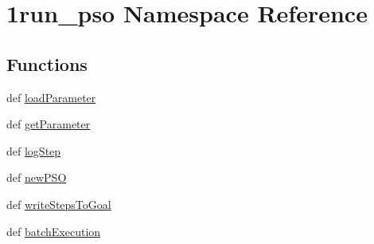 \hypertarget{namespace1run__pso}{
\section{1run\_\-pso Namespace Reference}
\label{namespace1run__pso}
}


\subsection*{Functions}
\begin{CompactItemize}
\item 
def \hyperlink{namespace1run__pso_cdea20440c628cecc2b9d5f96294b17d}{loadParameter}
\item 
def \hyperlink{namespace1run__pso_a2417e9179c3deb2afc2ce7abadd92b4}{getParameter}
\item 
def \hyperlink{namespace1run__pso_3bc1038823675978297b8b7f2522f9be}{logStep}
\item 
def \hyperlink{namespace1run__pso_69791748325e4a2d8da2348215efbc27}{newPSO}
\item 
def \hyperlink{namespace1run__pso_12a59cd77498da5a806d37f3f06c64a5}{writeStepsToGoal}
\item 
def \hyperlink{namespace1run__pso_86e2a58b6a7a817f1f49c277acbfe403}{batchExecution}
\end{CompactItemize}
